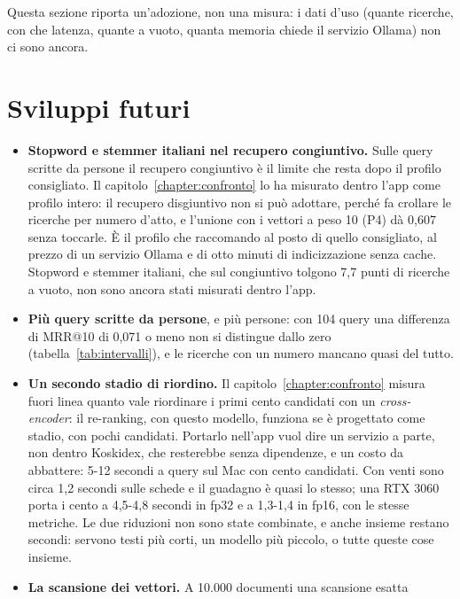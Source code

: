 Questa sezione riporta un'adozione, non una misura: i dati d'uso (quante
ricerche, con che latenza, quante a vuoto, quanta memoria chiede il servizio
Ollama) non ci sono ancora.

\section{Sviluppi futuri}\label{sec:sviluppi}

\begin{itemize}
  \item \textbf{Stopword e stemmer italiani nel recupero congiuntivo.} Sulle
        query scritte da persone il recupero congiuntivo è il limite che resta
        dopo il profilo consigliato. Il capitolo~\ref{chapter:confronto} lo ha
        misurato dentro l'app come profilo intero: il recupero disgiuntivo non
        si può adottare, perché fa crollare le ricerche per numero d'atto, e
        l'unione con i vettori a peso 10 (P4) dà 0,607 senza toccarle. È il
        profilo che raccomando al posto di quello consigliato, al prezzo di un servizio Ollama e di otto minuti
        di indicizzazione senza cache. Stopword e stemmer italiani, che sul
        congiuntivo tolgono 7,7 punti di ricerche a vuoto, non sono ancora stati
        misurati dentro l'app.
  \item \textbf{Più query scritte da persone}, e più persone: con 104 query una
        differenza di MRR@10 di 0,071 o meno non si distingue dallo zero
        (tabella~\ref{tab:intervalli}), e le ricerche con un numero mancano quasi del
        tutto.
  \item \textbf{Un secondo stadio di riordino.} Il capitolo~\ref{chapter:confronto}
        misura fuori linea quanto vale riordinare i primi cento candidati con un
        \emph{cross-encoder}: il re-ranking, con questo modello, funziona se è progettato come
        stadio, con pochi candidati. Portarlo nell'app
        vuol dire un servizio a parte, non dentro Koskidex, che resterebbe
        senza dipendenze, e un costo da abbattere: 5-12 secondi a query sul Mac con
        cento candidati. Con venti sono circa 1,2 secondi sulle schede e il
        guadagno è quasi lo stesso; una RTX 3060 porta i cento a 4,5-4,8
        secondi in fp32 e a 1,3-1,4 in fp16, con le stesse metriche. Le due
        riduzioni non sono state combinate, e anche insieme restano secondi:
        servono testi più corti, un modello più piccolo, o tutte queste cose
        insieme.
  \item \textbf{La scansione dei vettori.} A 10.000 documenti una scansione esatta

\end{itemize}
